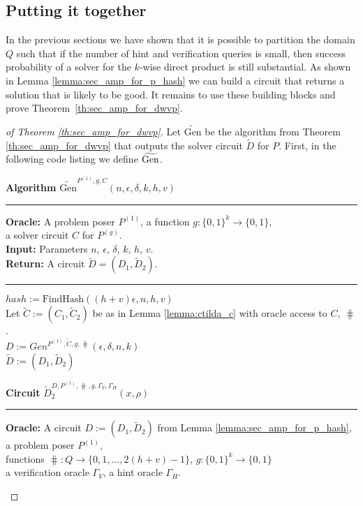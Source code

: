 %
\subsection{Putting it together}
\label{st:put_together}
In the previous sections we have shown that it is possible to partition the domain $Q$ such that
if the number of hint and verification queries is small, then success probability
of a solver for the $k$-wise direct product is still substantial.
As shown in Lemma \ref{lemma:sec_amp_for_p_hash} we can build a circuit that returns a solution that is likely to be good.
It remains to use these building blocks and prove Theorem~\ref{th:sec_amp_for_dwvp}.

\begin{proof}[of Theorem \ref{th:sec_amp_for_dwvp}]
Let $\widetilde{\text{Gen}}$ be the algorithm from Theorem \ref{th:sec_amp_for_dwvp} that outputs
the solver circuit $\widetilde{D}$ for $P$. First, in the following code listing we define $\widetilde{\operatorname{\text{Gen}}}$.
%
\begin{codeblock}
  \textbf{Algorithm} $\widetilde{\text{Gen}}^{P^{(1)}, g, C}(n, \epsilon, \delta, k, h, v)$
  \medskip\hrule
  \textbf{Oracle:} A problem poser $P^{(1)}$, a function $g: \{0,1\}^{k} \rightarrow \{0,1\}$, \\
  \IndII a solver circuit $C$ for $P^{(g)}$.  \\
  \textbf{Input:} Parameters $n$, $\epsilon$, $\delta$, $k$, $h$, $v$.\\
  \textbf{Return:} A circuit $\widetilde{D} = (D_1, \widetilde{D}_2)$.
  \medskip\hrule
  $hash := \text{FindHash}((h+v)\epsilon, n, h, v)$ \\
  Let $\widetilde{C} := (C_1, \widetilde{C}_2)$ be as in Lemma \ref{lemma:ctilda_c} with oracle access to $C$, $\hash$. \\
  $D := Gen^{P^{(1)},  \widetilde{C},  g, \hash}(\epsilon, \delta, n, k)$ \\
  \Return $\widetilde{D} := (D_1, \widetilde{D}_2)$
\end{codeblock}
%
\begin{codeblock}
  \textbf{Circuit} $\widetilde{D}_2^{D, P^{(1)}, \hash, g, \Gamma_V, \Gamma_H}(x, \rho)$
  \medskip \hrule
  \textbf{Oracle:} A circuit $D :=(D_1, \widetilde{D}_2)$ from Lemma \ref{lemma:sec_amp_for_p_hash}, a problem poser $P^{(1)}$, \\
  \IndII functions $\hash: Q \rightarrow \{0,1, \dots, 2(h+v) - 1\}$, $g: \{0,1\}^{k} \rightarrow \{0,1\}$ \\
  \IndII a verification oracle $\Gamma_V$, a hint oracle $\Gamma_H$.\\

\end{codeblock}
\end{proof}
